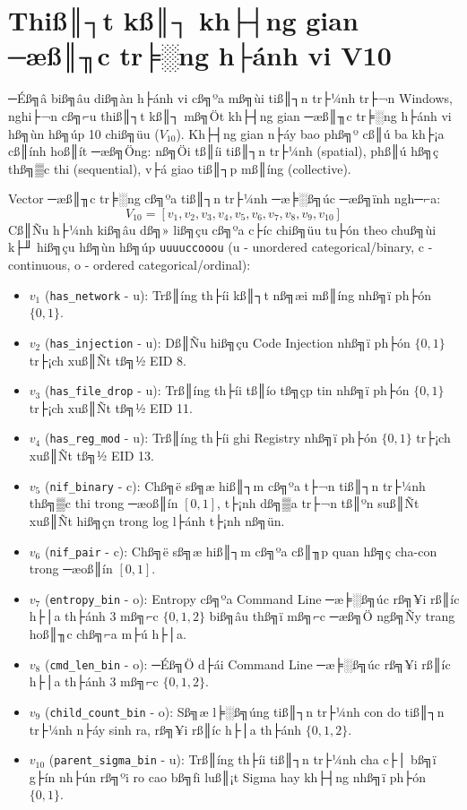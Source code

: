 ﻿\documentclass[../main.tex]{subfiles}
\begin{document}
\section{Thiß║┐t kß║┐ kh├┤ng gian ─æß║╖c tr╞░ng h├ánh vi V10}
\label{section:2.2}

─Éß╗â biß╗âu diß╗àn h├ánh vi cß╗ºa mß╗ùi tiß║┐n tr├¼nh tr├¬n Windows, nghi├¬n cß╗⌐u thiß║┐t kß║┐ mß╗Öt kh├┤ng gian ─æß║╖c tr╞░ng h├ánh vi hß╗ùn hß╗úp 10 chiß╗üu ($V_{10}$). Kh├┤ng gian n├áy bao phß╗º cß║ú ba kh├¡a cß║ính hoß║ít ─æß╗Öng: nß╗Öi tß║íi tiß║┐n tr├¼nh (spatial), phß║ú hß╗ç thß╗▒c thi (sequential), v├á giao tiß║┐p mß║íng (collective).

Vector ─æß║╖c tr╞░ng cß╗ºa tiß║┐n tr├¼nh ─æ╞░ß╗úc ─æß╗ïnh ngh─⌐a:
\begin{equation}
    V_{10} = [v_1, v_2, v_3, v_4, v_5, v_6, v_7, v_8, v_9, v_{10}]
\end{equation}
Cß║Ñu h├¼nh kiß╗âu dß╗» liß╗çu cß╗ºa c├íc chiß╗üu tu├ón theo chuß╗ùi k├╜ hiß╗çu hß╗ùn hß╗úp \texttt{uuuuccooou} (u - unordered categorical/binary, c - continuous, o - ordered categorical/ordinal):
\begin{itemize}
    \item $v_1$ (\texttt{has\_network} - u): Trß║íng th├íi kß║┐t nß╗æi mß║íng nhß╗ï ph├ón $\{0, 1\}$.
    \item $v_2$ (\texttt{has\_injection} - u): Dß║Ñu hiß╗çu Code Injection nhß╗ï ph├ón $\{0, 1\}$ tr├¡ch xuß║Ñt tß╗½ EID 8.
    \item $v_3$ (\texttt{has\_file\_drop} - u): Trß║íng th├íi tß║ío tß╗çp tin nhß╗ï ph├ón $\{0, 1\}$ tr├¡ch xuß║Ñt tß╗½ EID 11.
    \item $v_4$ (\texttt{has\_reg\_mod} - u): Trß║íng th├íi ghi Registry nhß╗ï ph├ón $\{0, 1\}$ tr├¡ch xuß║Ñt tß╗½ EID 13.
    \item $v_5$ (\texttt{nif\_binary} - c): Chß╗ë sß╗æ hiß║┐m cß╗ºa t├¬n tiß║┐n tr├¼nh thß╗▒c thi trong ─æoß║ín $[0, 1]$, t├¡nh dß╗▒a tr├¬n tß║ºn suß║Ñt xuß║Ñt hiß╗çn trong log l├ánh t├¡nh nß╗ün.
    \item $v_6$ (\texttt{nif\_pair} - c): Chß╗ë sß╗æ hiß║┐m cß╗ºa cß║╖p quan hß╗ç cha-con trong ─æoß║ín $[0, 1]$.
    \item $v_7$ (\texttt{entropy\_bin} - o): Entropy cß╗ºa Command Line ─æ╞░ß╗úc rß╗¥i rß║íc h├│a th├ánh 3 mß╗⌐c $\{0, 1, 2\}$ biß╗âu thß╗ï mß╗⌐c ─æß╗Ö ngß╗Ñy trang hoß║╖c chß╗⌐a m├ú h├│a.
    \item $v_8$ (\texttt{cmd\_len\_bin} - o): ─Éß╗Ö d├ái Command Line ─æ╞░ß╗úc rß╗¥i rß║íc h├│a th├ánh 3 mß╗⌐c $\{0, 1, 2\}$.
    \item $v_9$ (\texttt{child\_count\_bin} - o): Sß╗æ l╞░ß╗úng tiß║┐n tr├¼nh con do tiß║┐n tr├¼nh n├áy sinh ra, rß╗¥i rß║íc h├│a th├ánh $\{0, 1, 2\}$.
    \item $v_{10}$ (\texttt{parent\_sigma\_bin} - u): Trß║íng th├íi tiß║┐n tr├¼nh cha c├│ bß╗ï g├ín nh├ún rß╗ºi ro cao bß╗ƒi luß║¡t Sigma hay kh├┤ng nhß╗ï ph├ón $\{0, 1\}$.
\end{itemize}
\end{document}
